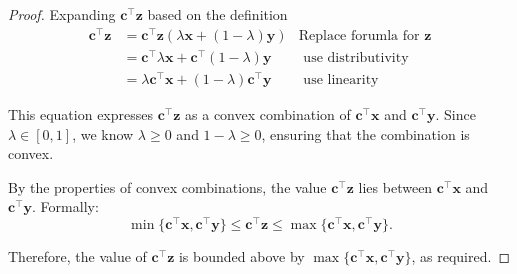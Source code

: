 \begin{proof}
Expanding $\mathbf{c}^\top \mathbf{z}$ based on the definition
\begin{align*}
\mathbf{c}^\top \mathbf{z}  &= \mathbf{c}^\top \mathbf{z} (\lambda \mathbf{x} + (1-\lambda) \mathbf{y}) & \text{Replace forumla for $\mathbf{z}$}\\
& =  \mathbf{c}^\top \lambda\mathbf{x} +  \mathbf{c}^\top (1-\lambda)\mathbf{y} & \text{ use distributivity}\\
& = \lambda \mathbf{c}^\top \mathbf{x} + (1-\lambda) \mathbf{c}^\top\mathbf{y} & \text{ use linearity}
\end{align*}


This equation expresses \(\mathbf{c}^\top \mathbf{z}\) as a convex combination of \(\mathbf{c}^\top \mathbf{x}\) and \(\mathbf{c}^\top \mathbf{y}\). Since \(\lambda \in [0, 1]\), we know \(\lambda \geq 0\) and \(1-\lambda \geq 0\), ensuring that the combination is convex.


\begin{center}
\end{center}



By the properties of convex combinations, the value \(\mathbf{c}^\top \mathbf{z}\) lies between \(\mathbf{c}^\top \mathbf{x}\) and \(\mathbf{c}^\top \mathbf{y}\). Formally:
\[
\min\{\mathbf{c}^\top \mathbf{x}, \mathbf{c}^\top \mathbf{y}\} \leq \mathbf{c}^\top \mathbf{z} \leq \max\{\mathbf{c}^\top \mathbf{x}, \mathbf{c}^\top \mathbf{y}\}.
\]



Therefore, the value of \(\mathbf{c}^\top \mathbf{z}\) is bounded above by \(\max\{\mathbf{c}^\top \mathbf{x}, \mathbf{c}^\top \mathbf{y}\}\), as required.
\end{proof}

